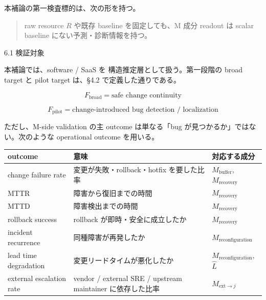 \documentclass[12pt,a4paper]{article}
\begin{document}
本補論の第一検査標的は、次の形を持つ。

\begin{quote}
raw resource $R$ や既存 baseline を固定しても、M 成分 readout は scalar baseline にない予測・診断情報を持つ。
\end{quote}

6.1 検証対象

本補論では、software / SaaS を 構造推定層として扱う。第一段階の broad target と pilot target は、§4.2 で定義した通りである。

\[
F_{\mathrm{broad}} = \text{safe change continuity}
\]

\[
F_{\mathrm{pilot}} = \text{change-introduced bug detection / localization}
\]

ただし、M-side validation の主 outcome は単なる「bug が見つかるか」ではない。次のような operational outcome を用いる。

{\def\LTcaptype{table} %
\begin{longtable}[]{@{}
  >{\raggedright\arraybackslash}p{}
  >{\raggedright\arraybackslash}p{}
  >{\raggedright\arraybackslash}p{}@{}}
\toprule\noalign{}
\begin{minipage}[b]{\linewidth}\raggedright
outcome
\end{minipage} & \begin{minipage}[b]{\linewidth}\raggedright
意味
\end{minipage} & \begin{minipage}[b]{\linewidth}\raggedright
対応する成分
\end{minipage} \\
\midrule\noalign{}
\endhead
\bottomrule\noalign{}
\endlastfoot
change failure rate & 変更が失敗・rollback・hotfix を要した比率 & \(M_{\mathrm{buffer}}\), \(M_{\mathrm{recovery}}\) \\
MTTR & 障害から復旧までの時間 & \(M_{\mathrm{recovery}}\) \\
MTTD & 障害検出までの時間 & \(M_{\mathrm{recovery}}\) \\
rollback success & rollback が即時・安全に成立したか & \(M_{\mathrm{recovery}}\) \\
incident recurrence & 同種障害が再発したか & \(M_{\mathrm{reconfiguration}}\) \\
lead time degradation & 変更リードタイムが悪化したか & \(M_{\mathrm{reconfiguration}}\), \(\hat L\) \\
external escalation rate & vendor / external SRE / upstream maintainer に依存した比率 & \(M_{\mathrm{ext}\to j}\) \\
\end{longtable}
}
\end{document}
